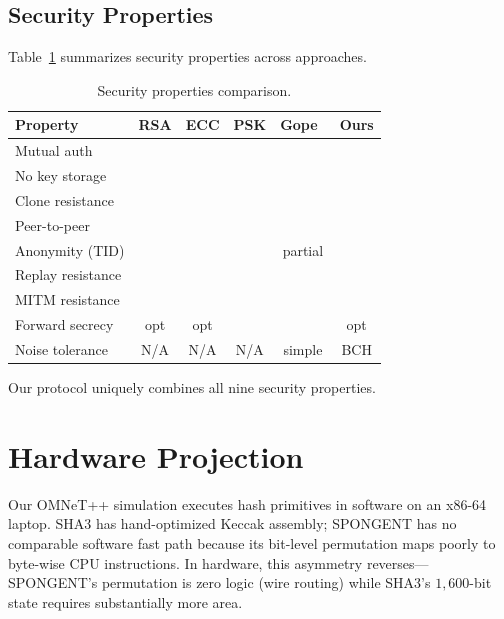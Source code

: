 \documentclass[journal,a4paper,10pt]{IEEEtran}
\newcommand{\xmark}{\ding{55}}
\newcommand{\cmark}{\checkmark}
\begin{document}
\subsection{Security Properties}
Table~\ref{tab:security_comparison} summarizes security properties
across approaches.

\begin{table}[t]
\centering
\caption{Security properties comparison.}
\label{tab:security_comparison}
\begin{tabular}{@{}p{2.6cm}ccccc@{}}
\toprule
\textbf{Property} & \textbf{RSA} & \textbf{ECC} & \textbf{PSK}
& \textbf{Gope}~\cite{puf_lightweight_uav} & \textbf{Ours} \\
\midrule
Mutual auth                & \cmark & \cmark & \cmark & \cmark & \cmark \\
No key storage             & \xmark & \xmark & \xmark & \cmark & \cmark \\
Clone resistance           & \xmark & \xmark & \xmark & \cmark & \cmark \\
Peer-to-peer               & \cmark & \cmark & \cmark & \xmark & \cmark \\
Anonymity (TID)            & \xmark & \xmark & \xmark & partial & \cmark \\
Replay resistance          & \cmark & \cmark & \cmark & \cmark & \cmark \\
MITM resistance            & \cmark & \cmark & \cmark & \cmark & \cmark \\
Forward secrecy            & opt    & opt    & \xmark & \xmark & opt \\
Noise tolerance            & N/A    & N/A    & N/A    & simple & BCH \\
\bottomrule
\end{tabular}
\end{table}

Our protocol uniquely combines all nine security properties.


\section{Hardware Projection}
\label{sec:hardware}

Our OMNeT++ simulation executes hash primitives in software on an
x86-64 laptop. SHA3 has hand-optimized Keccak assembly; SPONGENT has
no comparable software fast path because its bit-level permutation
maps poorly to byte-wise CPU instructions. In hardware, this asymmetry
reverses---SPONGENT's permutation is zero logic (wire routing) while
SHA3's $1{,}600$-bit state requires substantially more area.
\end{document}
